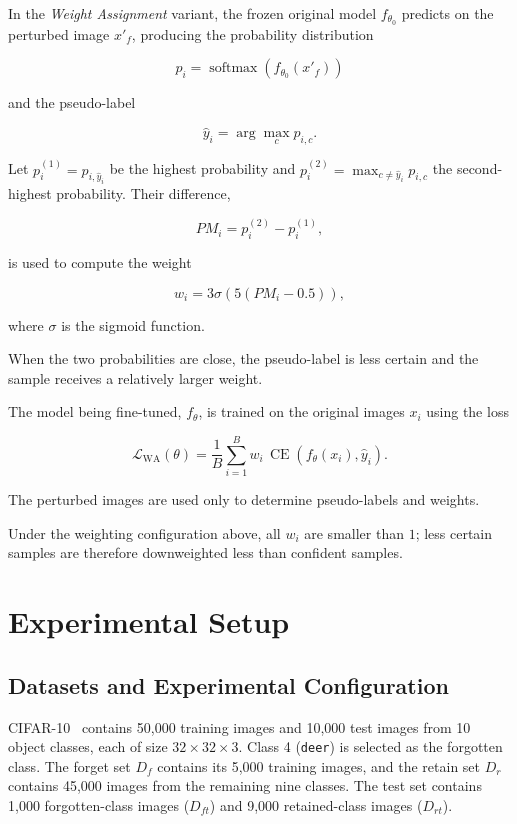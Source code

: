\documentclass[conference]{IEEEtran}
\begin{document}
In the \textit{Weight Assignment} variant, the frozen original model \(f_{\theta_0}\) predicts on the perturbed image \(x'_f\), producing the probability distribution

\[
p_i = \operatorname{softmax}(f_{\theta_0}(x'_f))
\]

and the pseudo-label

\[
\hat{y}_i = \arg\max_c p_{i,c}.
\]

Let \(p_i^{(1)} = p_{i,\hat{y}_i}\) be the highest probability and \(p_i^{(2)} = \max_{c\ne\hat{y}_i}p_{i,c}\) the second-highest probability. Their difference,

\[
PM_i = p_i^{(2)} - p_i^{(1)},
\]

is used to compute the weight

\[
w_i = 3\sigma\!\left(5(PM_i-0.5)\right),
\]

where \(\sigma\) is the sigmoid function.

When the two probabilities are close, the pseudo-label is less certain and the sample receives a relatively larger weight.

The model being fine-tuned, \(f_\theta\), is trained on the original images \(x_i\) using the loss

\[
\mathcal{L}_{\mathrm{WA}}(\theta)
=
\frac{1}{B}
\sum_{i=1}^{B}
w_i\,\operatorname{CE}(f_\theta(x_i),\hat{y}_i).
\]

The perturbed images are used only to determine pseudo-labels and weights.

Under the weighting configuration above, all \(w_i\) are smaller than \(1\); less certain samples are therefore downweighted less than confident samples.
\section{Experimental Setup}
\label{sec:protocol}
\subsection{Datasets and Experimental Configuration}
CIFAR-10~\cite{krizhevsky2009learning} contains 50,000 training images and 10,000 test images from 10 object classes, each of size $32\times32\times3$. Class 4 (\texttt{deer}) is selected as the forgotten class. The forget set $D_f$ contains its 5,000 training images, and the retain set $D_r$ contains 45,000 images from the remaining nine classes. The test set contains 1,000 forgotten-class images ($D_{ft}$) and 9,000 retained-class images ($D_{rt}$).
\end{document}
